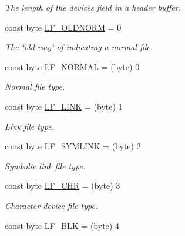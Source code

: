 \begin{DoxyCompactItemize}
\begin{DoxyCompactList}\small\item\em The length of the devices field in a header buffer. \end{DoxyCompactList}\item 
const byte \hyperlink{class_i_c_sharp_code_1_1_sharp_zip_lib_1_1_tar_1_1_tar_header_a529ae23422128401d41a03f28cf705cf}{L\+F\+\_\+\+O\+L\+D\+N\+O\+RM} = 0
\begin{DoxyCompactList}\small\item\em The \char`\"{}old way\char`\"{} of indicating a normal file. \end{DoxyCompactList}\item 
const byte \hyperlink{class_i_c_sharp_code_1_1_sharp_zip_lib_1_1_tar_1_1_tar_header_a3445cb23cb354681ebb6e91dc1c8bf5d}{L\+F\+\_\+\+N\+O\+R\+M\+AL} = (byte) \textquotesingle{}0\textquotesingle{}
\begin{DoxyCompactList}\small\item\em Normal file type. \end{DoxyCompactList}\item 
const byte \hyperlink{class_i_c_sharp_code_1_1_sharp_zip_lib_1_1_tar_1_1_tar_header_a3dc29098526d3abf0f416d64e42f38a6}{L\+F\+\_\+\+L\+I\+NK} = (byte) \textquotesingle{}1\textquotesingle{}
\begin{DoxyCompactList}\small\item\em Link file type. \end{DoxyCompactList}\item 
const byte \hyperlink{class_i_c_sharp_code_1_1_sharp_zip_lib_1_1_tar_1_1_tar_header_af55286784aa8e9c639c545a089c22f6a}{L\+F\+\_\+\+S\+Y\+M\+L\+I\+NK} = (byte) \textquotesingle{}2\textquotesingle{}
\begin{DoxyCompactList}\small\item\em Symbolic link file type. \end{DoxyCompactList}\item 
const byte \hyperlink{class_i_c_sharp_code_1_1_sharp_zip_lib_1_1_tar_1_1_tar_header_a8df0c2ed6795f1358a116d7c4e352231}{L\+F\+\_\+\+C\+HR} = (byte) \textquotesingle{}3\textquotesingle{}
\begin{DoxyCompactList}\small\item\em Character device file type. \end{DoxyCompactList}\item 
const byte \hyperlink{class_i_c_sharp_code_1_1_sharp_zip_lib_1_1_tar_1_1_tar_header_a94fc816c57c317389139b4c4d1145489}{L\+F\+\_\+\+B\+LK} = (byte) \textquotesingle{}4\textquotesingle{}

\end{DoxyCompactItemize}

